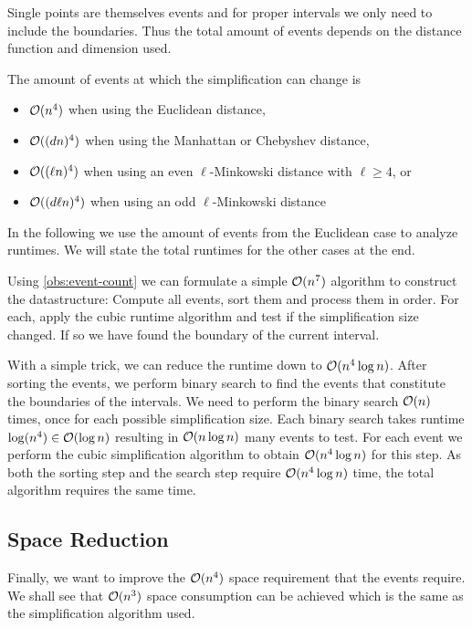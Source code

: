 Single points are themselves events and for proper intervals we only need to include the boundaries. Thus the total amount of events depends on the distance function and dimension used. 

\begin{observation}\label{obs:event-count}
	The amount of events at which the simplification can change is 
	\begin{itemize}
		\item \(\mathcal{O}(n^4)\) when using the Euclidean distance, 
		\item \(\mathcal{O}((dn)^4)\) when using the Manhattan or Chebyshev distance,
		\item \(\mathcal{O}((\ell n)^4)\) when using an even \(\ell\)-Minkowski distance with \(\ell \geq 4\), or 
		\item \(\mathcal{O}((d \ell n)^4)\) when using an odd \(\ell\)-Minkowski distance
	\end{itemize}
\end{observation}

In the following we use the amount of events from the Euclidean case to analyze runtimes. We will state the total runtimes for the other cases at the end. 

Using \cref{obs:event-count} we can formulate a simple \(\mathcal{O}(n^7)\) algorithm to construct the datastructure: Compute all events, sort them and process them in order. For each, apply the cubic runtime algorithm and test if the simplification size changed. If so we have found the boundary of the current interval.

With a simple trick, we can reduce the runtime down to \(\mathcal{O}(n^4 \log n)\). After sorting the events, we perform binary search to find the events that constitute the boundaries of the intervals. We need to perform the binary search \(\mathcal{O}(n)\) times, once for each possible simplification size. Each binary search takes runtime \(\log(n^4) \in \mathcal{O}(\log n)\) resulting in \(\mathcal{O}(n \log n)\) many events to test. For each event we perform the cubic simplification algorithm to obtain \(\mathcal{O}(n^4 \log n)\) for this step. As both the sorting step and the search step require \(\mathcal{O}(n^4\log n)\) time, the total algorithm requires the same time. 

\subsection{Space Reduction}\label{ssec:space-reduction-ds}
Finally, we want to improve the \(\mathcal{O}(n^4)\) space requirement that the events require. We shall see that \(\mathcal{O}(n^3)\) space consumption can be achieved which is the same as the simplification algorithm used. 

